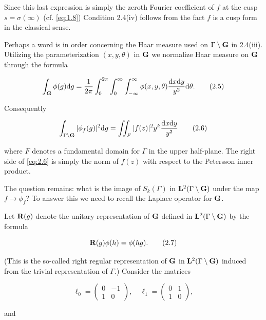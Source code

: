 Since this last expression is simply the zeroth Fourier coefficient of $f$ at the cusp $s = \sigma(\infty)$ (cf. \eqref{eq:1.8}) Condition 2.4(iv) follows from the fact $f$ is a cusp form in the classical sense.

Perhaps a word is in order concerning the Haar measure used on $\Gamma \setminus \mathbf{G}$ in 2.4(iii). Utilizing the parameterization $(x, y, \theta)$ in $\mathbf{G}$ we normalize Haar measure on $\mathbf{G}$ through the formula

\begin{equation}\label{eq:2.5}
\int_{\mathbf{G}} \phi(g) \mathrm{d} g = \frac{1}{2\pi} \int_0^{2\pi} \int_0^{\infty} \int_{-\infty}^{\infty} \phi(x, y, \theta) \frac{\mathrm{d} x \mathrm{d} y}{y^2} \mathrm{d}\theta.\tag{2.5}
\end{equation}

Consequently

\begin{equation}\label{eq:2.6}
\int_{\Gamma \setminus \mathbf{G}} |\phi_f(g)|^2 \mathrm{d} g = \iint_F |f(z)|^2 y^k \frac{\mathrm{d} x \mathrm{d} y}{y^2}\tag{2.6}
\end{equation}

where $F$ denotes a fundamental domain for $\Gamma$ in the upper half-plane. The right side of \eqref{eq:2.6} is simply the norm of $f(z)$ with respect to the Petersson inner product.

The question remains: what is the image of $S_k(\Gamma)$ in $\mathbf{L}^2(\Gamma \setminus \mathbf{G})$ under the map $f \to \phi_f$? To answer this we need to recall the Laplace operator for $\mathbf{G}$.

Let $\mathbf{R}(g)$ denote the unitary representation of $\mathbf{G}$ defined in $\mathbf{L}^2(\Gamma \setminus \mathbf{G})$ by the formula

\begin{equation}\label{eq:2.7}
\mathbf{R}(g)\phi(h) = \phi(hg).\tag{2.7}
\end{equation}

(This is the so-called right regular representation of $\mathbf{G}$ in $\mathbf{L}^2(\Gamma \setminus \mathbf{G})$ induced from the trivial representation of $\Gamma$.) Consider the matrices

\[
\ell_0 = \begin{pmatrix} 0 & -1 \\ 1 & 0 \end{pmatrix}, \quad \ell_1 = \begin{pmatrix} 0 & 1 \\ 1 & 0 \end{pmatrix},
\]

and

